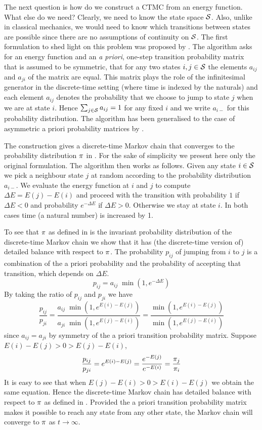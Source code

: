 The next question is how do we construct a CTMC
from an energy function.
What else do we need?
Clearly, we need to know the state space $\mathcal{S}$.
Also, unlike in classical mechanics,
we would need to know which transitions between states are possible
since there are no assumptions of continuity on $\mathcal{S}$.
The first formulation to shed light on this problem
was proposed by \citet{metropolis}.
The algorithm asks for an energy function and an \emph{a priori},
one-step transition probability matrix
that is assumed to be symmetric,
\ie that for any two states $i,j \in \mathcal{S}$
the elements $a_{ij}$ and $a_{ji}$ of the matrix are equal.
This matrix plays the role of the infinitesimal generator in the
discrete-time setting (\ie where time is indexed by the naturals)
and each element $a_{ij}$ denotes the probability that
we choose to jump to state $j$ when we are at state $i$.
Hence $\sum_{j \in \mathcal{S}} a_{ij} = 1$ for any fixed $i$
and we write $a_{i-}$ for this probability distribution.
The algorithm has been generalised to the case of asymmetric
a priori probability matrices by \citet{hastings}.

The construction gives a discrete-time Markov chain that
converges to the probability distribution $\pi$ in .
For the sake of simplicity we present here
only the original formulation.
The algorithm then works as follows.
Given any state $i \in \mathcal{S}$ we pick a neighbour state $j$
at random according to the probability distribution $a_{i-}$.
We evaluate the energy function at $i$ and $j$
to compute $\Delta E = E(j)-E(i)$ and proceed with the transition
with probability $1$ if $\Delta E < 0$ and
probability $e^{-\Delta E}$ if $\Delta E > 0$.
Otherwise we stay at state $i$.
In both cases time (a natural number) is increased by 1.

To see that $\pi$ as defined in  is the invariant
probability distribution of the discrete-time Markov chain
we show that it has (the discrete-time version of)
detailed balance with respect to $\pi$.
The probability $p_{ij}$ of jumping from $i$ to $j$ is
a combination of the a priori probability and
the probability of accepting that transition,
which depends on $\Delta E$.
\[ p_{ij} = a_{ij}\; \min(1, e^{-\Delta E}) \]
By taking the ratio of $p_{ij}$ and $p_{ji}$ we have
\[ \frac{p_{ij}}{p_{ji}} =
   \frac{a_{ij}\; \min(1, e^{E(i)-E(j)})}{
         a_{ji}\; \min(1, e^{E(j)-E(i)})} =
   \frac{\min(1, e^{E(i)-E(j)})}{
         \min(1, e^{E(j)-E(i)})} \]
since $a_{ij} = a_{ji}$ by symmetry of the
a priori transition probability matrix.
Suppose $E(i)-E(j) > 0 > E(j)-E(i)$,
\[ \frac{p_{ij}}{p_{ji}} = e^{E(i)-E(j)}
     = \frac{e^{-E(j)}}{e^{-E(i)}} = \frac{\pi_{j}}{\pi_{i}} \]
It is easy to see that when
$E(j)-E(i) > 0 > E(i)-E(j)$ we obtain the same equation.
Hence the discrete-time Markov chain has detailed balance
with respect to $\pi$ as defined in .
Provided the a priori transition probability matrix
makes it possible to reach any state from any other state,
the Markov chain will converge to $\pi$ as $t \to \infty$.

